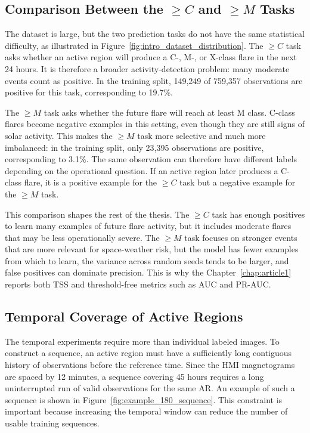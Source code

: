 \subsection{Comparison Between the $\geq C$ and $\geq M$ Tasks}

The dataset is large, but the two prediction tasks do not have the same statistical difficulty, as illustrated in Figure~\ref{fig:intro_dataset_distribution}. The $\geq C$ task asks whether an active region will produce a C-, M-, or X-class flare in the next 24 hours. It is therefore a broader activity-detection problem: many moderate events count as positive. In the training split, 149,249 of 759,357 observations are positive for this task, corresponding to 19.7\%.

The $\geq M$ task asks whether the future flare will reach at least M class. C-class flares become negative examples in this setting, even though they are still signs of solar activity. This makes the $\geq M$ task more selective and much more imbalanced: in the training split, only 23,395 observations are positive, corresponding to 3.1\%. The same observation can therefore have different labels depending on the operational question. If an active region later produces a C-class flare, it is a positive example for the $\geq C$ task but a negative example for the $\geq M$ task.

This comparison shapes the rest of the thesis. The $\geq C$ task has enough positives to learn many examples of future flare activity, but it includes moderate flares that may be less operationally severe. The $\geq M$ task focuses on stronger events that are more relevant for space-weather risk, but the model has fewer examples from which to learn, the variance across random seeds tends to be larger, and false positives can dominate precision. This is why the Chapter~\ref{chap:article1} reports both TSS and threshold-free metrics such as AUC and PR-AUC.

\subsection{Temporal Coverage of Active Regions}

The temporal experiments require more than individual labeled images. To construct a sequence, an active region must have a sufficiently long contiguous history of observations before the reference time. Since the HMI magnetograms are spaced by 12 minutes, a sequence covering 45 hours requires a long uninterrupted run of valid observations for the same AR. An example of such a sequence is shown in Figure~\ref{fig:example_180_sequence}. This constraint is important because increasing the temporal window can reduce the number of usable training sequences. 

